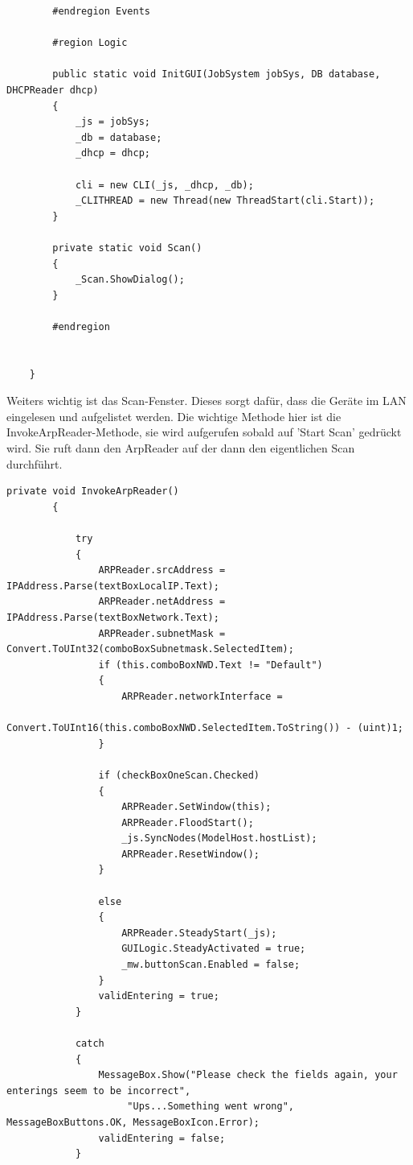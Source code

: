 \documentclass[12pt,a4paper]{report}
\begin{document}
\begin{onehalfspace}
\begin{lstlisting}
        #endregion Events

        #region Logic

        public static void InitGUI(JobSystem jobSys, DB database, DHCPReader dhcp)
        {
            _js = jobSys;
            _db = database;
            _dhcp = dhcp;

            cli = new CLI(_js, _dhcp, _db);
            _CLITHREAD = new Thread(new ThreadStart(cli.Start));
        }

        private static void Scan()
        {
            _Scan.ShowDialog();
        }

        #endregion 
                

    }
\end{lstlisting}
Weiters wichtig ist das Scan-Fenster. Dieses sorgt dafür, dass die Geräte im LAN eingelesen und aufgelistet werden. Die wichtige Methode hier ist die InvokeArpReader-Methode, sie wird aufgerufen sobald auf 'Start Scan' gedrückt wird. Sie ruft dann den ArpReader auf der dann den eigentlichen Scan durchführt.\\
\begin{lstlisting}
private void InvokeArpReader()
        {

            try
            {
                ARPReader.srcAddress = IPAddress.Parse(textBoxLocalIP.Text);
                ARPReader.netAddress = IPAddress.Parse(textBoxNetwork.Text);
                ARPReader.subnetMask = Convert.ToUInt32(comboBoxSubnetmask.SelectedItem);
                if (this.comboBoxNWD.Text != "Default")
                {
                    ARPReader.networkInterface =
                    	 Convert.ToUInt16(this.comboBoxNWD.SelectedItem.ToString()) - (uint)1;
                }

                if (checkBoxOneScan.Checked)
                {
                    ARPReader.SetWindow(this);
                    ARPReader.FloodStart();
                    _js.SyncNodes(ModelHost.hostList);
                    ARPReader.ResetWindow();
                }

                else
                {
                    ARPReader.SteadyStart(_js);
                    GUILogic.SteadyActivated = true;
                    _mw.buttonScan.Enabled = false;
                }
                validEntering = true;
            }

            catch
            {
                MessageBox.Show("Please check the fields again, your enterings seem to be incorrect",
                	 "Ups...Something went wrong", MessageBoxButtons.OK, MessageBoxIcon.Error);
                validEntering = false;
            }


\end{lstlisting}
\end{onehalfspace}
\end{document}
